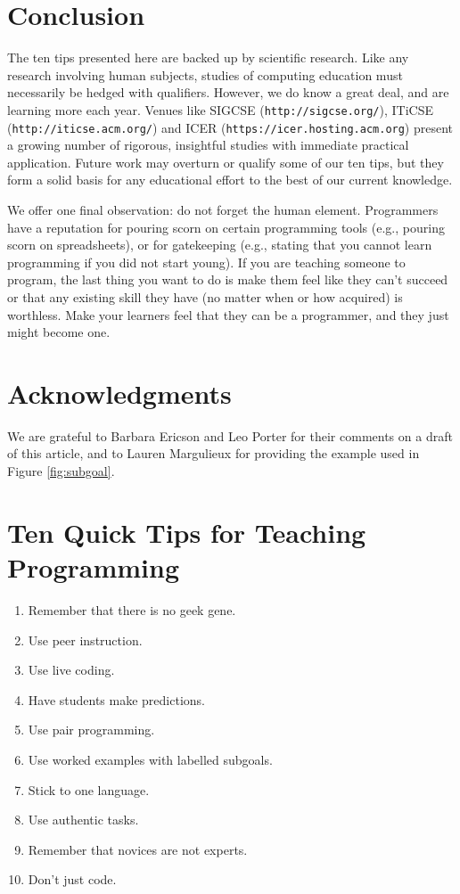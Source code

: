 \documentclass[10pt,letterpaper]{article}
\newcommand{\url}[1]{\texttt{#1}}
\begin{document}
\section*{Conclusion}

The ten tips presented here are backed up by scientific research.
Like any research involving human subjects,
studies of computing education must necessarily be hedged with qualifiers.
However,
we do know a great deal,
and are learning more each year.
Venues like SIGCSE (\url{http://sigcse.org/}), ITiCSE (\url{http://iticse.acm.org/}) and ICER (\url{https://icer.hosting.acm.org})
present a growing number of rigorous, insightful studies
with immediate practical application.
Future work may overturn or qualify some of our ten tips,
but they form a solid basis for any educational effort to the best of our current knowledge.

We offer one final observation: do not forget the human element.
Programmers have a reputation for pouring scorn on certain programming tools (e.g., pouring scorn on spreadsheets),
or for gatekeeping (e.g., stating that you cannot learn programming if you did not start young).
If you are teaching someone to program,
the last thing you want to do is make them feel like they can't succeed
or that any existing skill they have (no matter when or how acquired) is worthless.
Make your learners feel that they can be a programmer,
and they just might become one.

\section*{Acknowledgments}

We are grateful to Barbara Ericson and Leo Porter for their comments on a draft of this article, and to Lauren Margulieux for providing the example used in Figure \ref{fig:subgoal}.

\pagebreak

\section*{Ten Quick Tips for Teaching Programming}

\begin{enumerate}
\item Remember that there is no geek gene.
\item Use peer instruction.
\item Use live coding.
\item Have students make predictions.
\item Use pair programming.
\item Use worked examples with labelled subgoals.
\item Stick to one language.
\item Use authentic tasks.
\item Remember that novices are not experts.
\item Don't just code.
\end{enumerate}
\end{document}
